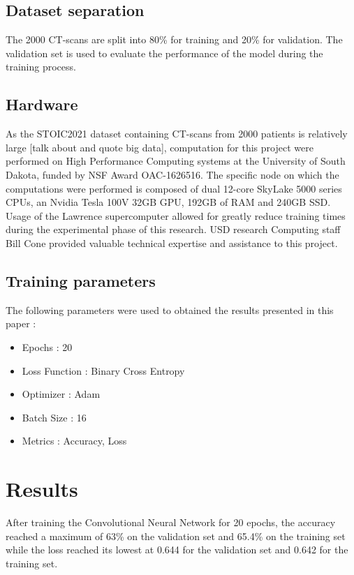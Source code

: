 \documentclass[12pt, letterpaper]{article}
\begin{document}
\subsection{Dataset separation}

The 2000 CT-scans are split into 80\% for training and 20\% for validation.  The validation set is used to evaluate the performance of the model during the training process.

\subsection{Hardware}
As the STOIC2021 dataset containing CT-scans from 2000 patients is relatively large [talk about and quote big data], computation for this project were performed on High Performance Computing systems at the University of South Dakota, funded by NSF Award OAC-1626516. The specific node on which the computations were performed is composed of dual 12-core SkyLake 5000 series CPUs, an Nvidia Tesla 100V 32GB GPU, 192GB of RAM and 240GB SSD. Usage of the Lawrence supercomputer allowed for greatly reduce training times during the experimental phase of this research. USD research Computing staff Bill Cone provided valuable technical expertise and assistance to this project.


\subsection{Training parameters}
The following parameters were used to obtained the results presented in this paper :
\begin{itemize}
    \item Epochs : 20
    \item Loss Function : Binary Cross Entropy
    \item Optimizer : Adam
    \item Batch Size : 16
    \item Metrics : Accuracy, Loss
\end{itemize}

\newpage
\section{Results}
After training the Convolutional Neural Network for 20 epochs, the accuracy reached a maximum of 63\% on the validation set and 65.4\% on the training set while the loss reached its lowest at 0.644 for the validation set and 0.642 for the training set. 
\end{document}
